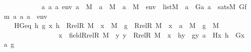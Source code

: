 \begin{isabellebody}
\ \ \ \ \ \ \ \ \ \ {\isachardoublequoteopen}\ {\isacharparenleft}{\kern0pt}{\isasymAnd}a{}\ a{}\ a{}\ env{\isachardot}{\kern0pt}\ a{}\ {\isasymin}\ M\ {\isasymLongrightarrow}\ a{}\ {\isasymin}\ M\ {\isasymLongrightarrow}\ a{}\ {\isasymin}\ M\ {\isasymLongrightarrow}\ env\ {\isasymin}\ list{\isacharparenleft}{\kern0pt}M{\isacharparenright}{\kern0pt}\ {\isasymLongrightarrow}\ a{}\ {\isacharequal}{\kern0pt}\ G{\isacharparenleft}{\kern0pt}a{}{\isacharcomma}{\kern0pt}\ a{}{\isacharparenright}{\kern0pt}\ {\isasymlongleftrightarrow}\ sats{\isacharparenleft}{\kern0pt}M{\isacharcomma}{\kern0pt}\ Gfm{\isacharcomma}{\kern0pt}\ {\isacharbrackleft}{\kern0pt}a{}{\isacharcomma}{\kern0pt}\ a{}{\isacharcomma}{\kern0pt}\ a{}{\isacharbrackright}{\kern0pt}\ {\isacharat}{\kern0pt}\ env{\isacharparenright}{\kern0pt}{\isacharparenright}{\kern0pt}{\isachardoublequoteclose}\ \ \isanewline
\ \ \ HGeq{\isacharcolon}{\kern0pt}\ {\isachardoublequoteopen}{\isasymAnd}h\ g\ x{\isachardot}{\kern0pt}\ h\ {\isasymin}\ Rrel{\isacharparenleft}{\kern0pt}R{\isacharcomma}{\kern0pt}\ M{\isacharparenright}{\kern0pt}\ {\isacharminus}{\kern0pt}{\isacharbackquote}{\kern0pt}{\isacharbackquote}{\kern0pt}\ {\isacharbraceleft}{\kern0pt}x{\isacharbraceright}{\kern0pt}\ {\isasymrightarrow}\ M\ {\isasymLongrightarrow}\ g\ {\isasymin}\ {\isacharparenleft}{\kern0pt}Rrel{\isacharparenleft}{\kern0pt}R{\isacharcomma}{\kern0pt}\ M{\isacharparenright}{\kern0pt}\ {\isacharminus}{\kern0pt}{\isacharbackquote}{\kern0pt}{\isacharbackquote}{\kern0pt}\ {\isacharbraceleft}{\kern0pt}x{\isacharbraceright}{\kern0pt}\ {\isasymtimes}\ {\isacharbraceleft}{\kern0pt}a{\isacharbraceright}{\kern0pt}{\isacharparenright}{\kern0pt}\ {\isasymrightarrow}\ M\ {\isasymLongrightarrow}\ g\ {\isasymin}\ M\ \ \isanewline
\ \ \ \ \ \ \ \ \ \ \ \ \ \ \ {\isasymLongrightarrow}\ x\ {\isasymin}\ field{\isacharparenleft}{\kern0pt}Rrel{\isacharparenleft}{\kern0pt}R{\isacharcomma}{\kern0pt}\ M{\isacharparenright}{\kern0pt}{\isacharparenright}{\kern0pt}\ {\isasymLongrightarrow}\ {\isacharparenleft}{\kern0pt}{\isasymAnd}y{\isachardot}{\kern0pt}\ y\ {\isasymin}\ Rrel{\isacharparenleft}{\kern0pt}R{\isacharcomma}{\kern0pt}\ M{\isacharparenright}{\kern0pt}\ {\isacharminus}{\kern0pt}{\isacharbackquote}{\kern0pt}{\isacharbackquote}{\kern0pt}\ {\isacharbraceleft}{\kern0pt}x{\isacharbraceright}{\kern0pt}\ {\isasymLongrightarrow}\ h{\isacharbackquote}{\kern0pt}y\ {\isacharequal}{\kern0pt}\ g{\isacharbackquote}{\kern0pt}{\isacharless}{\kern0pt}y{\isacharcomma}{\kern0pt}\ a{\isachargreater}{\kern0pt}{\isacharparenright}{\kern0pt}\ {\isasymLongrightarrow}\ H{\isacharparenleft}{\kern0pt}x{\isacharcomma}{\kern0pt}\ h{\isacharparenright}{\kern0pt}\ {\isacharequal}{\kern0pt}\ G{\isacharparenleft}{\kern0pt}{\isacharless}{\kern0pt}x{\isacharcomma}{\kern0pt}\ a{\isachargreater}{\kern0pt}{\isacharcomma}{\kern0pt}\ g{\isacharparenright}{\kern0pt}{\isachardoublequoteclose}\ \ \isanewline

\end{isabellebody}
